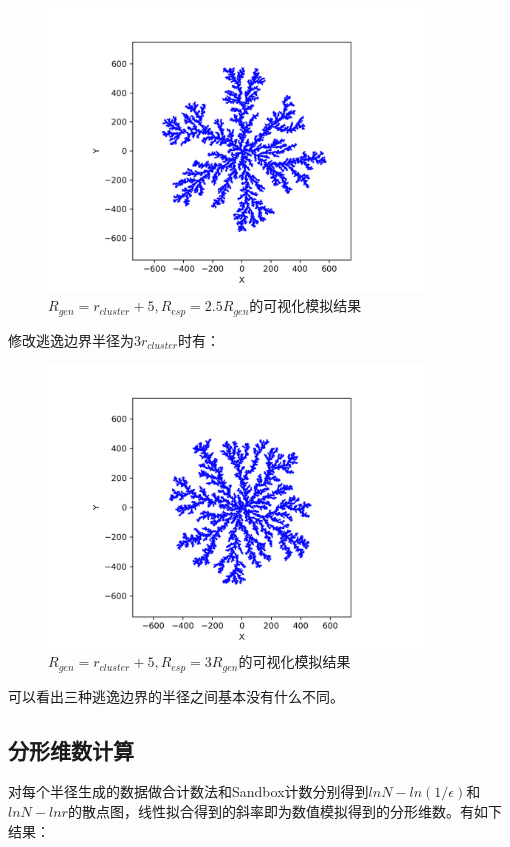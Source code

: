 \documentclass[a4paper,11pt]{article}
\begin{document}
\begin{figure}[!htbp]        
\centering
\includegraphics[bb= 0 0 460.8 345.6, width = 10cm]{改变max/1500-5*104-5-2.5*min.png}     
\caption{$R_{gen} = r_{cluster} + 5, R_{esp} = 2.5R_{gen}$的可视化模拟结果}      
\end{figure}

修改逃逸边界半径为$3r_{cluster}$时有：


\begin{figure}[!htbp]        
\centering
\includegraphics[bb= 0 0 460.8 345.6, width = 10cm]{改变max/2000-5*104-5-3*min.png}      
\caption{$R_{gen} = r_{cluster} + 5, R_{esp} = 3R_{gen}$的可视化模拟结果}      
\end{figure}


\newpage
可以看出三种逃逸边界的半径之间基本没有什么不同。


\subsection{分形维数计算}
对每个半径生成的数据做合计数法和Sandbox计数分别得到$lnN-ln(1/\epsilon)$和$lnN-lnr$的散点图，线性拟合得到的斜率即为数值模拟得到的分形维数。有如下结果：
\end{document}
